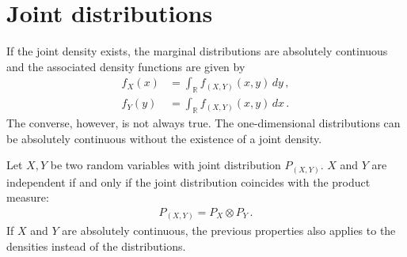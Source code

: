 \section{Joint distributions}


    \begin{result}
        If the joint density exists, the marginal distributions are absolutely continuous and the associated density functions are given by
        \begin{align}
            f_X(x) &= \int_{\mathbb{R}}f_{(X,Y)}(x,y)\,dy\,,\\
            f_Y(y) &= \int_{\mathbb{R}}f_{(X,Y)}(x,y)\,dx\,.
        \end{align}
        The converse, however, is not always true. The one-dimensional distributions can be absolutely continuous without the existence of a joint density.
    \end{result}

    \begin{property}[Independence]\label{prob:independent_densities}
        Let $X,Y$ be two random variables with joint distribution $P_{(X,Y)}$. $X$ and $Y$ are independent if and only if the joint distribution coincides with the product measure:
        \begin{gather}
            P_{(X,Y)} = P_X\otimes P_Y\,.
        \end{gather}
        If $X$ and $Y$ are absolutely continuous, the previous properties also applies to the densities instead of the distributions.
    \end{property}

